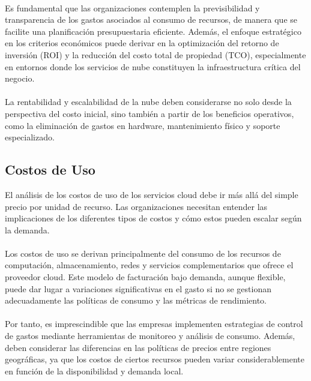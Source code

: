 {        \paragraph{}Es fundamental que las organizaciones contemplen la previsibilidad y transparencia de los gastos asociados al consumo de recursos, de manera que se facilite una planificación presupuestaria eficiente. Además, el enfoque estratégico en los criterios económicos puede derivar en la optimización del retorno de inversión (ROI) y la reducción del costo total de propiedad (TCO), especialmente en entornos donde los servicios de nube constituyen la infraestructura crítica del negocio.

        \paragraph{}La rentabilidad y escalabilidad de la nube deben considerarse no solo desde la perspectiva del costo inicial, sino también a partir de los beneficios operativos, como la eliminación de gastos en hardware, mantenimiento físico y soporte especializado.
        
        \subsection{Costos de Uso}
            El análisis de los costos de uso de los servicios cloud debe ir más allá del simple precio por unidad de recurso. Las organizaciones necesitan entender las implicaciones de los diferentes tipos de costos y cómo estos pueden escalar según la demanda.

            \paragraph{} Los costos de uso se derivan principalmente del consumo de los recursos de computación, almacenamiento, redes y servicios complementarios que ofrece el proveedor cloud. Este modelo de facturación bajo demanda, aunque flexible, puede dar lugar a variaciones significativas en el gasto si no se gestionan adecuadamente las políticas de consumo y las métricas de rendimiento.

            \paragraph{} Por tanto, es imprescindible que las empresas implementen estrategias de control de gastos mediante herramientas de monitoreo y análisis de consumo. Además, deben considerar las diferencias en las políticas de precios entre regiones geográficas, ya que los costos de ciertos recursos pueden variar considerablemente en función de la disponibilidad y demanda local.

}
